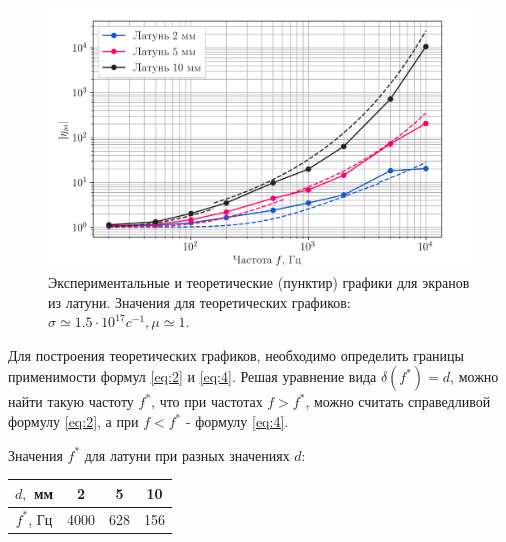 \begin{figure}[H]
	\centering
	\includegraphics[width=0.95\linewidth]{imgs/graphs/lat.png}
	\caption{Экспериментальные и теоретические (пунктир) графики для экранов из латуни. Значения для теоретических
	графиков: $\sigma \simeq 1.5 \cdot 10^{17}c^{-1}, \mu \simeq 1$.}
	\label{fig:figure3}
\end{figure}

Для построения теоретических графиков, необходимо определить границы применимости формул \eqref{eq:2} и \eqref{eq:4}.
Решая уравнение вида $\delta(f^*) = d$, можно найти такую частоту $f^*$, что при частотах $f>f^*$, можно считать справедливой формулу
\eqref{eq:2}, а при $f<f^*$ - формулу \eqref{eq:4}.

Значения $f^*$ для латуни при разных значениях $d$:
\begin{table}[H]
	\centering
	\begin{tabular}{|c|c|c|c|}
	\hline
	$d,$ мм & 2 & 5 & 10 \\ \hline
	$f^*$, Гц  & 4000  & 628  & 156 \\ \hline
	\end{tabular}
\end{table}







